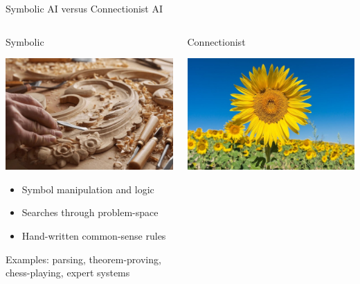\documentclass[aspectratio=169]{beamer}
\begin{document}
\begin{frame}{Symbolic AI versus Connectionist AI}
\vspace{-0.7 cm}

\begin{columns}[t]
\begin{center}
\Large Symbolic

\vspace{0.25 cm}
\includegraphics[width=0.8\linewidth]{img/craftsmanship.jpg}

\normalsize
\vspace{0.25 cm}
\begin{itemize}
\item Symbol manipulation and logic
\item Searches through problem-space
\item Hand-written common-sense rules
\end{itemize}

Examples: parsing, theorem-proving, chess-playing, expert systems
\end{center}

\begin{center}
\Large Connectionist

\vspace{0.25 cm}
\includegraphics[width=0.8\linewidth]{img/farming.jpg}


\end{center}
\end{columns}
\end{frame}
\end{document}
